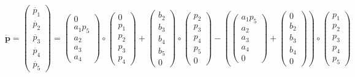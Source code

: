 \documentclass[11pt]{amsart}
\begin{document}
\begin{equation}
    \boldsymbol{\dot{p}}
        =
    \begin{pmatrix} \dot{p_1} \\ \dot{p_2} \\ \dot{p_3} \\ \dot{p_4} \\ \dot{p_5} \end{pmatrix}
        =
    \begin{pmatrix} 0 \\ a_1 p_5 \\ a_2 \\ a_3 \\ a_4 \end{pmatrix} 
        \circ 
    \begin{pmatrix} 0 \\ p_1 \\ p_2 \\ p_3 \\ p_4 \end{pmatrix} 
        + 
    \begin{pmatrix} b_2 \\ b_3 \\ b_4 \\ b_5 \\ 0 \end{pmatrix} 
        \circ 
    \begin{pmatrix} p_2 \\ p_3 \\ p_4 \\ p_5 \\ 0 \end{pmatrix} 
        - 
    \left(\begin{pmatrix} a_1 p_5 \\ a_2 \\ a_3 \\ a_4 \\ 0 \end{pmatrix} + \begin{pmatrix} 0 \\ b_2 \\ b_3 \\ b_4 \\ 0 \end{pmatrix}\right) 
        \circ 
    \begin{pmatrix} p_1 \\ p_2 \\ p_3 \\ p_4 \\ p_5 \end{pmatrix}
\label{eq:VectorizedModel}
\end{equation}
\end{document}
